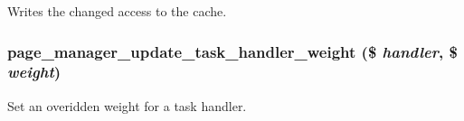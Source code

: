 Writes the changed access to the cache. \hypertarget{page__manager_8module_a95fb7f141656e679dc592eed96c71d6c}{
\subsubsection[{page\_\-manager\_\-update\_\-task\_\-handler\_\-weight}]{\setlength{\rightskip}{0pt plus 5cm}page\_\-manager\_\-update\_\-task\_\-handler\_\-weight (\$ {\em handler}, \/  \$ {\em weight})}}
\label{page__manager_8module_a95fb7f141656e679dc592eed96c71d6c}
Set an overidden weight for a task handler.

